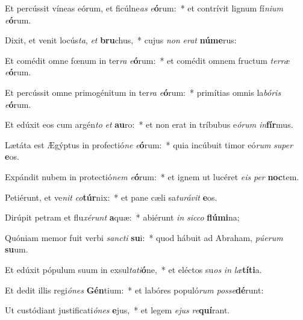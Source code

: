 \item Et percússit víneas eórum, et ficúlne\textit{as} \textit{e}\textbf{ó}rum:~* et contrívit lignum fí\textit{ni}\textit{um} \textit{e}\textbf{ó}rum.
\item Dixit, et venit locús\textit{ta}, \textit{et} \textbf{bru}chus,~* cujus \textit{non} \textit{e}\textit{rat} \textbf{nú}\textbf{me}rus:
\item Et comédit omne fœnum in ter\textit{ra} \textit{e}\textbf{ó}rum:~* et comédit omnem fructum \textit{ter}\textit{ræ} \textit{e}\textbf{ó}rum.
\item Et percússit omne primogénitum in ter\textit{ra} \textit{e}\textbf{ó}rum:~* primítias omnis la\textit{bó}\textit{ris} \textit{e}\textbf{ó}rum.
\item Et edúxit eos cum argén\textit{to} \textit{et} \textbf{au}ro:~* et non erat in tríbubus e\textit{ó}\textit{rum} \textit{in}\textbf{fír}mus.
\item Lætáta est Ægýptus in profectió\textit{ne} \textit{e}\textbf{ó}rum:~* quia incúbuit timor eó\textit{rum} \textit{su}\textit{per} \textbf{e}os.
\item Expándit nubem in protectió\textit{nem} \textit{e}\textbf{ó}rum:~* et ignem ut lucéret \textit{e}\textit{is} \textit{per} \textbf{noc}tem.
\item Petiérunt, et ve\textit{nit} \textit{co}\textbf{túr}nix:~* et pane cæli sa\textit{tu}\textit{rá}\textit{vit} \textbf{e}os.
\item Dirúpit petram et flu\textit{xé}\textit{runt} \textbf{a}quæ:~* abiérunt \textit{in} \textit{sic}\textit{co} \textbf{flú}\textbf{mi}na;
\item Quóniam memor fuit verbi \textit{sanc}\textit{ti} \textbf{su}i:~* quod hábuit ad Abraham, \textit{pú}\textit{e}\textit{rum} \textbf{su}um.
\item Et edúxit pópulum suum in exsul\textit{ta}\textit{ti}\textbf{ó}ne,~* et eléctos su\textit{os} \textit{in} \textit{læ}\textbf{tí}\textbf{ti}a.
\item Et dedit illis regi\textit{ó}\textit{nes} \textbf{Gén}tium:~* et labóres populó\textit{rum} \textit{pos}\textit{se}\textbf{dé}runt:
\item Ut custódiant justificati\textit{ó}\textit{nes} \textbf{e}jus,~* et legem \textit{e}\textit{jus} \textit{re}\textbf{quí}rant.
